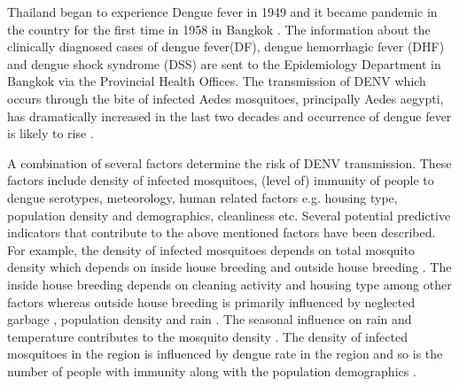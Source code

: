 \documentclass{bmcart}
\begin{document}
Thailand began to experience Dengue fever in 1949 and it became pandemic in the country for the first time in 1958 in Bangkok \cite{hammon1964virological}. The information about the clinically diagnosed cases of dengue fever(DF), dengue hemorrhagic fever (DHF) and dengue shock syndrome (DSS) are sent to the Epidemiology Department in Bangkok \cite{chareonsook1999changing} via the Provincial Health Offices. The transmission of DENV which occurs through the bite of infected Aedes mosquitoes, principally Aedes aegypti, has dramatically increased in the last two decades \cite{hesse2007dengue} and occurrence of dengue fever is likely to rise \cite{wilder2012denguetools}.

A combination of several factors determine the risk of DENV transmission. These factors include density of infected mosquitoes, (level of) immunity of people to dengue serotypes, meteorology, human related factors e.g. housing type, population density and demographics, cleanliness etc. Several potential predictive indicators that contribute to the above mentioned factors have been described\cite{leitmeyer1999dengue,runge2008does,thammapalo2008environmental,sarfraz2014near}. For example, the density of infected mosquitoes depends on total mosquito density \cite{scott2003aedes,alto2008larval} which depends on inside house breeding \cite{syarifah2008ovitrap} and outside house breeding \cite{sarfraz2014near}. The inside house breeding depends on cleaning activity \cite{chareonviriyaphap2003larval,raju2008application} and housing type \cite{favier2005influence} among other factors whereas outside house breeding is primarily influenced by neglected garbage \cite{arunachalam2010eco}, population density \cite{chang2009combining,knudsen1992vector,troyo2009urban} and rain \cite{nakhapakorn2005information}. The seasonal influence on rain \cite{WPR2015,stoddard2014long} and temperature \cite{lambrechts2011impact,carrington2013reduction,stoddard2014long} contributes to the mosquito density \cite{lambrechts2011impact,sulaiman1996relationship,thammapalo2008environmental,sarfraz2014near,nakhapakorn2005information}. The density of infected mosquitoes in the region is influenced by dengue rate in the region  \cite{halstead2008dengue,esteva2000influence} and so is the number of people with immunity \cite{adams2006cross,alto2008larval} along with the population demographics \cite{cummings2009impact,wilder2012denguetools,whodenvsym2015}. 
\end{document}
